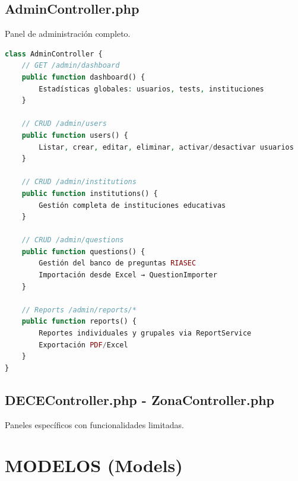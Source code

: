 \documentclass[12pt, a4paper]{report}
\begin{document}
\section{AdminController.php}
Panel de administración completo.
\begin{lstlisting}[language=PHP, caption=AdminController.php - Funcionalidades]
class AdminController {
    // GET /admin/dashboard
    public function dashboard() {
        Estadísticas globales: usuarios, tests, instituciones
    }
    
    // CRUD /admin/users
    public function users() {
        Listar, crear, editar, eliminar, activar/desactivar usuarios
    }
    
    // CRUD /admin/institutions
    public function institutions() {
        Gestión completa de instituciones educativas
    }
    
    // CRUD /admin/questions
    public function questions() {
        Gestión del banco de preguntas RIASEC
        Importación desde Excel → QuestionImporter
    }
    
    // Reports /admin/reports/*
    public function reports() {
        Reportes individuales y grupales via ReportService
        Exportación PDF/Excel
    }
}
\end{lstlisting}

\section{DECEController.php - ZonaController.php}
Paneles específicos con funcionalidades limitadas.

\chapter{MODELOS (Models)}
\end{document}
